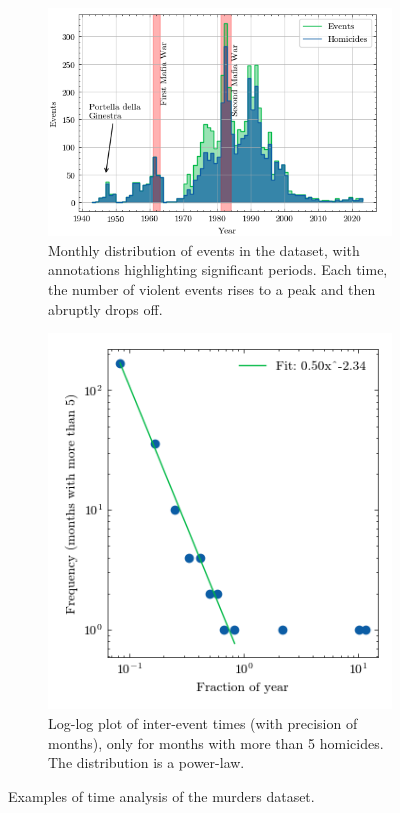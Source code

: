 \begin{figure}[H]
  \centering
  \begin{subfigure}[t]{.55\textwidth}
    \centering
    \includegraphics[width=\textwidth]{figures/omicidi.png}
    \caption{Monthly distribution of events in the dataset, with annotations highlighting significant periods. Each time, the number of violent events rises to a peak and then abruptly drops off.}
    \label{fig:omicidi}
  \end{subfigure}%
  \begin{subfigure}[t]{.36\textwidth}
    \centering
    \includegraphics[width=\textwidth, trim={0 0.6cm 0 0},clip]{figures/intertimes.png}
    \caption{Log-log plot of inter-event times (with precision of months), only for months with more than 5 homicides. The distribution is a power-law.}
    \label{fig:intertimes}
  \end{subfigure}
  \caption{Examples of time analysis of the murders dataset.}
\end{figure}
